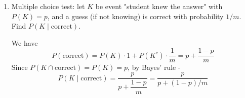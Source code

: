 \begin{enumerate}
\begin{enumerate}
        \noindent \begin{proof}Using the previous inequality with $A_i$ replaced by $A_i^c$,
        \[
        P\Big(\bigcap_{i=1}^n A_i\Big)=1-P\Big(\bigcup_{i=1}^n A_i^c\Big)\ge 1-\sum_{i=1}^n P(A_i^c)
        \]
        But $\sum_{i=1}^n P(A_i^c)=n-\sum_{i=1}^n P(A_i)$, so
        \[
        P\Big(\bigcap_{i=1}^n A_i\Big)\ge 1-(n-\sum_{i=1}^n P(A_i))=\sum_{i=1}^n P(A_i)-(n-1)
        \]
        \end{proof}
    \end{enumerate}
    \item Multiple choice test: let $K$ be event "student knew the answer" with $P(K)=p$, and a guess (if not knowing) is correct with probability $1/m$. Find $P(K\mid\text{correct})$.
    
    We have
    $$P(\text{correct})=P(K)\cdot 1 + P(K^c)\cdot\frac{1}{m}=p+\frac{1-p}{m}$$
    Since $P(K\cap\text{correct})=P(K)=p$, by Bayes' rule - 
    $$\boxed{P(K\mid\text{correct})=\frac{p}{p+\dfrac{1-p}{m}}=\frac{p}{p+(1-p)/m}}$$
\end{enumerate}




